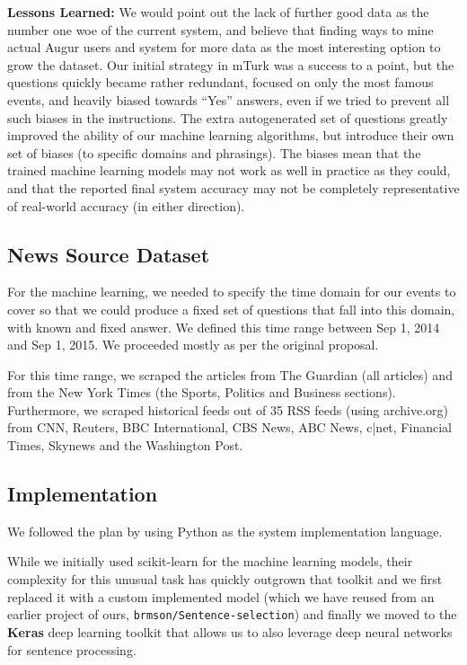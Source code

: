 \documentclass[11pt,a4paper]{article}
\begin{document}
\textbf{Lessons Learned:} We would point out the lack of further good data
as the number one woe of the current system, and believe that finding ways
to mine actual Augur users and system for more data as the most interesting
option to grow the dataset.  Our initial strategy in mTurk was a success
to a point, but the questions quickly became rather redundant, focused on
only the most famous events, and heavily biased towards ``Yes'' answers,
even if we tried to prevent all such biases in the instructions.
The extra autogenerated set of questions greatly improved the ability
of our machine learning algorithms, but introduce their own set of biases
(to specific domains and phrasings).  The biases mean that the trained
machine learning models may not work as well in practice as they could,
and that the reported final system accuracy may not be completely
representative of real-world accuracy (in either direction).


\subsection{News Source Dataset}

For the machine learning, we needed to specify the time domain for our
events to cover so that we could produce a fixed set of questions that fall
into this domain, with known and fixed answer.  We defined this time range
between Sep 1, 2014 and Sep 1, 2015.  We proceeded mostly as per the original
proposal.

For this time range, we scraped the articles from The Guardian (all articles)
and from the New York Times (the Sports, Politics and Business sections).
Furthermore, we scraped historical feeds out of 35 RSS feeds (using archive.org)
from CNN, Reuters, BBC International, CBS News, ABC News, c|net, Financial Times,
Skynews and the Washington Post.

\subsection{Implementation}

We followed the plan by using Python as the system implementation language.

While we initially used scikit-learn for the machine learning models,
their complexity for this unusual task has quickly outgrown that toolkit
and we first replaced it with a custom implemented model (which we have
reused from an earlier project of ours, \texttt{brmson/Sentence-selection})
and finally we moved to the \textbf{Keras} deep learning toolkit that
allows us to also leverage deep neural networks for sentence processing.
\end{document}
